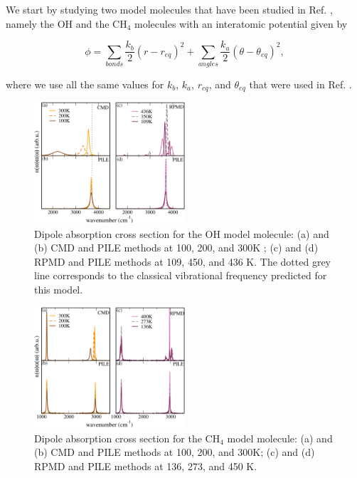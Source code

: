 \documentclass[aps,prb,superscriptaddress,amsmath,amssymb,showpacs,twocolumn]{revtex4}
\begin{document}
We start by studying two model molecules that have been studied in Ref. \cite{witt+09jcp},
namely the OH and the CH$_4$ molecules with an interatomic potential given by

\begin{equation}
\phi=\sum_{bonds} \frac{k_b}{2} (r-r_{eq})^2 + \sum_{angles} \frac{k_a}{2}(\theta - \theta_{eq})^2,
\end{equation}

\noindent where we use all the same values for $k_b$, $k_a$, $r_{eq}$, and $\theta_{eq}$ that were used in Ref. \cite{witt+09jcp}.

\begin{figure}[htbp]
\centering
\includegraphics[width=0.5\textwidth]{figures/comparison_oh_factors.pdf}
\caption{Dipole absorption cross section for the OH model molecule: (a) and (b) CMD and PILE methods at 100, 200, and 300K ; (c)  and (d) RPMD and PILE methods at 109, 450, and 436 K. The dotted grey line corresponds to the classical vibrational frequency predicted for this model.}
\label{fig:oh-rpmd-cmd-pile}
\end{figure}

\begin{figure}[htbp]
\centering
\includegraphics[width=0.5\textwidth]{figures/comparison_ch4_factors.pdf}
\caption{Dipole absorption cross section for the CH$_4$ model molecule: (a) and (b) CMD and PILE methods at 100, 200, and 300K; (c) and (d) RPMD and PILE methods at 136, 273, and 450 K.}
\label{fig:ch4-rpmd-cmd-pile}
\end{figure}
\end{document}
